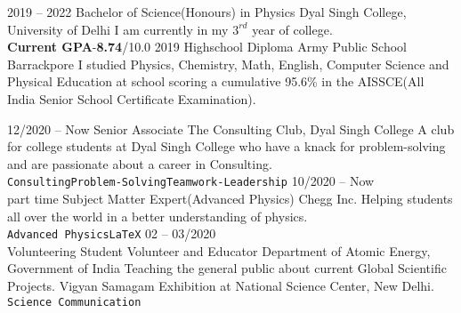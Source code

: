 \documentclass[9pt]{developercv} %
\begin{document}


\begin{entrylist}
	

	\entry
		{2019 -- 2022}
		{Bachelor of Science(Honours) in Physics}
		{Dyal Singh College, University of Delhi}
		{I am currently in my $3^{rd}$ year of college.\\ \textbf{Current GPA}-\textbf{8.74}/10.0}
	\entry
		{2019}
		{Highschool Diploma}
		{Army Public School Barrackpore}
		{I studied Physics, Chemistry, Math, English, Computer Science and Physical Education at school scoring a cumulative 95.6\% in the AISSCE(All India Senior School Certificate Examination).}
\end{entrylist}




\begin{entrylist}
	\entry
		{12/2020 -- Now}
		{Senior Associate}
		{The Consulting Club, Dyal Singh College}
		{A club for college students at Dyal Singh College who have a knack for problem-solving and are passionate about a career in Consulting.\\ 
		\texttt{Consulting}\slashsep\texttt{Problem-Solving}\slashsep\texttt{Teamwork-Leadership}}
	\entry
		{10/2020 -- Now\\\footnotesize{part time}}
		{Subject Matter Expert(Advanced Physics)}
		{Chegg Inc.}
		{Helping students all over the world in a better understanding of physics.\\ \texttt{Advanced Physics}\slashsep\texttt{LaTeX}}
	\entry
		{02 -- 03/2020\\\footnotesize{Volunteering}}
		{Student Volunteer and Educator}
		{Department of Atomic Energy, Government of India}
		{Teaching the general public about current Global Scientific Projects. Vigyan Samagam Exhibition at National Science Center, New Delhi.\\ 
		\texttt{Science Communication}}
\end{entrylist}

\end{document}
